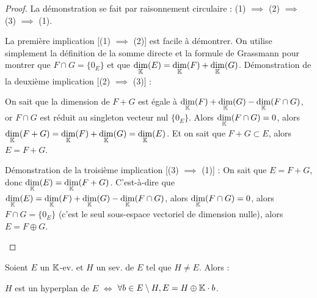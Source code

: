 \documentclass[12pt,a4paper]{report}
\begin{document}
\begin{proof}
    La démonstration se fait par raisonnement circulaire : (1) $\implies$ (2) $\implies$ (3) $\implies$ (1).

    \begin{outline}
        \1 La première implication [(1) $\implies$ (2)] est facile à démontrer. On utilise simplement la définition de la somme directe et la formule de Grassmann pour montrer que $F\cap G = \{0_E\}$ et que $\underset{\mathbb{K}}\dim(E) = \underset{\mathbb{K}}\dim(F) + \underset{\mathbb{K}}\dim(G)$.
        \1 Démonstration de la deuxième implication [(2) $\implies$ (3)] :
        
            \2 On sait que la dimension de $F+G$ est égale à $\underset{\mathbb{K}}\dim(F) + \underset{\mathbb{K}}\dim(G) - \underset{\mathbb{K}}\dim(F \cap G)$, or $F \cap G$ est réduit au singleton vecteur nul $\{0_E\}$.
            \2 Alors $\underset{\mathbb{K}}\dim(F \cap G) = 0$, alors $\underset{\mathbb{K}}\dim(F+G) = \underset{\mathbb{K}}\dim(F) + \underset{\mathbb{K}}\dim(G) = \underset{\mathbb{K}}\dim(E)$.
            \2 Et on sait que $F + G \subset E$, alors $E = F + G$.

        \1 Démonstration de la troisième implication [(3) $\implies$ (1)] :
            \2 On sait que $E = F+G$, donc $\underset{\mathbb{K}}\dim(E) = \underset{\mathbb{K}}\dim(F+G)$.
            \2 C'est-à-dire que $\underset{\mathbb{K}}\dim(E) = \underset{\mathbb{K}}\dim(F) + \underset{\mathbb{K}}\dim(G) - \underset{\mathbb{K}}\dim(F \cap G)$, alors $\underset{\mathbb{K}}\dim(F \cap G) = 0$, alors $F \cap G = \{0_E\}$ (c'est le seul sous-espace vectoriel de dimension nulle), alors $E = F \oplus G$.
    \end{outline}
\end{proof}

\begin{property}
    Soient $E$ un $\mathbb{K}$-ev. et $H$ un sev. de $E$ tel que $H \ne E$. Alors :

    $H$ est un hyperplan de $E$ $\iff$ $\forall b \in E\setminus H, E = H \oplus \mathbb{K} \cdot b$.
\end{property}
\end{document}
